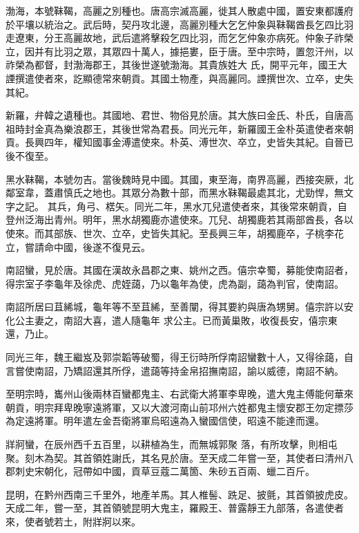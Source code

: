 \begin{pinyinscope}
 渤海，本號靺鞨，高麗之別種也。唐高宗滅高麗，徙其人散處中國，置安東都護府於平壤以統治之。武后時，契丹攻北邊，高麗別種大乞乞仲象與靺鞨酋長乞四比羽走遼東，分王高麗故地，武后遣將擊殺乞四比羽，而乞乞仲象亦病死。仲象子祚榮立，因并有比羽之眾，其眾四十萬人，據挹婁，臣于唐。至中宗時，置忽汗州，以祚榮為都督，封渤海郡王，其後世遂號渤海。其貴族姓大
 氏，開平元年，國王大諲撰遣使者來，訖顯德常來朝貢。其國土物產，與高麗同。諲撰世次、立卒，史失其紀。



 新羅，弁韓之遺種也。其國地、君世、物俗見於唐。其大族曰金氏、朴氏，自唐高祖時封金真為樂浪郡王，其後世常為君長。同光元年，新羅國王金朴英遣使者來朝貢。長興四年，權知國事金溥遣使來。朴英、溥世次、卒立，史皆失其紀。自晉已後不復至。



 黑水靺鞨，本號勿吉。當後魏時見中國。其國，東至海，南界高麗，西接突厥，北鄰室韋，蓋肅慎氏之地也。其眾分為數十部，而黑水靺鞨最處其北，尤勁悍，無文字之記。
 其兵，角弓、楛矢。同光二年，黑水兀兒遣使者來，其後常來朝貢，自登州泛海出青州。明年，黑水胡獨鹿亦遣使來。兀兒、胡獨鹿若其兩部酋長，各以使來。而其部族、世次、立卒，史皆失其紀。至長興三年，胡獨鹿卒，子桃李花立，嘗請命中國，後遂不復見云。



 南詔蠻，見於唐。其國在漢故永昌郡之東、姚州之西。僖宗幸蜀，募能使南詔者，得宗室子李龜年及徐虎、虎姪藹，乃以龜年為使，虎為副，藹為判官，使南詔。



 南詔所居曰苴絺城，龜年等不至苴絺，至善闡，得其要約與唐為甥舅。僖宗許以安化公主妻之，南詔大喜，遣人隨龜年
 求公主。已而黃巢敗，收復長安，僖宗東還，乃止。



 同光三年，魏王繼岌及郭崇韜等破蜀，得王衍時所俘南詔蠻數十人，又得徐藹，自言嘗使南詔，乃矯詔還其所俘，遣藹等持金帛招撫南詔，諭以威德，南詔不納。



 至明宗時，巂州山後兩林百蠻都鬼主、右武衛大將軍李卑晚，遣大鬼主傅能何華來朝貢，明宗拜卑晚寧遠將軍，又以大渡河南山前邛州六姓都鬼主懷安郡王勿定摽莎為定遠將軍。明年遣左金吾衛將軍烏昭遠為入蠻國信使，昭遠不能達而還。



 牂牁蠻，在辰州西千五百里，以耕植為生，而無城郭聚
 落，有所攻擊，則相屯聚。刻木為契。其首領姓謝氏，其名見於唐。至天成二年嘗一至，其使者曰清州八郡刺史宋朝化，冠帶如中國，貢草豆蔻二萬箇、朱砂五百兩、蠟二百斤。



 昆明，在黔州西南三千里外，地產羊馬。其人椎髻、跣足、披氈，其首領披虎皮。天成二年，嘗一至，其首領號昆明大鬼主，羅殿王、普露靜王九部落，各遣使者來，使者號若土，附牂牁以來。




\end{pinyinscope}
